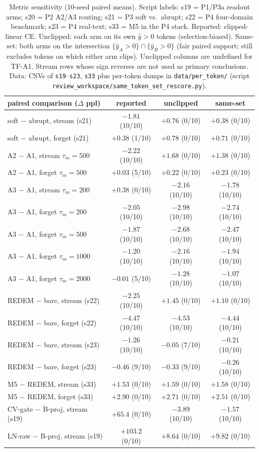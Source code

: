 \documentclass[preprint,12pt]{elsarticle}
\begin{document}
\begin{table}[t]
\centering
\scriptsize
\begin{tabular}{lccc}
\toprule
paired comparison ($\Delta$ ppl) & reported & unclipped & same-set \\
\midrule
soft $-$ abrupt, stream (s21) & $-1.81$ (10/10) & $+0.76$ (0/10) & $+0.38$ (0/10) \\
soft $-$ abrupt, forget (s21) & $+0.38$ (1/10) & $+0.78$ (0/10) & $+0.71$ (0/10) \\
A2 $-$ A1, stream $\tau_m{=}500$ & $-2.22$ (10/10) & $+1.68$ (0/10) & $+1.38$ (0/10) \\
A2 $-$ A1, forget $\tau_m{=}500$ & $+0.03$ (5/10) & $+0.22$ (0/10) & $+0.23$ (0/10) \\
A3 $-$ A1, stream $\tau_m{=}200$ & $+0.38$ (0/10) & $-2.16$ (10/10) & $-1.78$ (10/10) \\
A3 $-$ A1, forget $\tau_m{=}200$ & $-2.05$ (10/10) & $-2.98$ (10/10) & $-2.74$ (10/10) \\
A3 $-$ A1, forget $\tau_m{=}500$ & $-1.87$ (10/10) & $-2.68$ (10/10) & $-2.47$ (10/10) \\
A3 $-$ A1, forget $\tau_m{=}1000$ & $-1.20$ (10/10) & $-2.16$ (10/10) & $-1.94$ (10/10) \\
A3 $-$ A1, forget $\tau_m{=}2000$ & $-0.01$ (5/10) & $-1.28$ (10/10) & $-1.07$ (10/10) \\
REDEM $-$ bare, stream (s22) & $-2.25$ (10/10) & $+1.45$ (0/10) & $+1.10$ (0/10) \\
REDEM $-$ bare, forget (s22) & $-4.47$ (10/10) & $-4.53$ (10/10) & $-4.44$ (10/10) \\
REDEM $-$ bare, stream (s23) & $-1.26$ (10/10) & $-0.05$ (7/10) & $-0.21$ (10/10) \\
REDEM $-$ bare, forget (s23) & $-0.46$ (9/10) & $-0.33$ (9/10) & $-0.26$ (10/10) \\
M5 $-$ REDEM, stream (s33) & $+1.53$ (0/10) & $+1.59$ (0/10) & $+1.58$ (0/10) \\
M5 $-$ REDEM, forget (s33) & $+2.90$ (0/10) & $+2.71$ (0/10) & $+2.51$ (0/10) \\
CV-gate $-$ B-proj, stream (s19) & $+65.4$ (0/10) & $-3.89$ (10/10) & $-1.57$ (10/10) \\
LN-raw $-$ B-proj, stream (s19) & $+103.2$ (0/10) & $+8.64$ (0/10) & $+9.82$ (0/10) \\
\bottomrule
\end{tabular}
\caption{Metric sensitivity (10-seed paired means). Script labels:
s19 = P1/P3a readout arms; s20 = P2 A2/A3 routing; s21 = P3 soft vs.\
abrupt; s22 = P4 four-domain benchmark; s23 = P4 real-text; s33 = M5
in the P4 stack. Reported: clipped-linear
CE. Unclipped: each arm on its own $\hat y>0$ tokens (selection-biased).
Same-set: both arms on the intersection $\{\hat y_A>0\}\cap\{\hat y_B>0\}$
(fair paired support; still excludes tokens on which either arm clips).
Unclipped columns are undefined for TF-A1. Stream rows whose sign
reverses are not used as primary conclusions. Data: CSVs of
\texttt{s19}--\texttt{s23}, \texttt{s33} plus per-token dumps in
\texttt{data/per\_token/} (script
\texttt{review\_workspace/same\_token\_set\_rescore.py}).}
\label{tab:sens}
\end{table}
\end{document}

